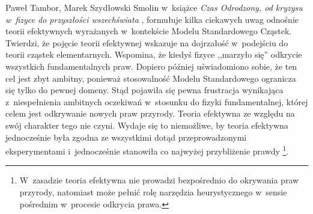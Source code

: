 \begin{artplenv2auth}{Paweł Tambor, Marek Szydłowski}
Smolin w~książce \textit{Czas Odrodzony, od kryzysu w~fizyce do przyszłości wszechświata}
\parencite*[][]{smolin_czas_2015}, %
 formułuje kilka ciekawych uwag odnośnie teorii efektywnych wyrażanych w~kontekście Modelu Standardowego Cząstek. Twierdzi, że pojęcie teorii efektywnej wskazuje na dojrzałość w~podejściu do teorii cząstek elementarnych. Wspomina, że kiedyś fizyce ,,marzyło się'' odkrycie wszystkich fundamentalnych praw. Dopiero później uświadomiono sobie, że ten cel jest zbyt ambitny, ponieważ stosowalność Modelu Standardowego ogranicza się tylko do pewnej domeny. Stąd pojawiła się pewna frustracja wynikająca z~niespełnienia ambitnych oczekiwań w~stosunku do fizyki fundamentalnej, której celem jest odkrywanie nowych praw przyrody. Teoria efektywna ze względu na swój charakter tego nie czyni. Wydaje się to niemożliwe, by teoria efektywna jednocześnie była zgodna ze wszystkimi dotąd przeprowadzonymi eksperymentami i~jednocześnie stanowiła co najwyżej przybliżenie prawdy 
\parencite[][s.~165]{smolin_czas_2015}%
\footnote{W~zasadzie teoria efektywna nie prowadzi bezpośrednio do okrywania praw przyrody, natomiast może pełnić rolę narzędzia heurystycznego w~sensie pośrednim w~procesie odkrycia prawa.}.


\end{artplenv2auth}
